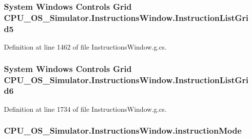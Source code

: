 \subsubsection[{Instruction\+List\+Grid5}]{\setlength{\rightskip}{0pt plus 5cm}System Windows Controls Grid C\+P\+U\+\_\+\+O\+S\+\_\+\+Simulator.\+Instructions\+Window.\+Instruction\+List\+Grid5\hspace{0.3cm}{\ttfamily [package]}}\label{class_c_p_u___o_s___simulator_1_1_instructions_window_a335e8ec02a78ffc483900745de96b602}


Definition at line 1462 of file Instructions\+Window.\+g.\+cs.

\hypertarget{class_c_p_u___o_s___simulator_1_1_instructions_window_a6c86a044f242ee64f312f0105bac6d36}{}
\subsubsection[{Instruction\+List\+Grid6}]{\setlength{\rightskip}{0pt plus 5cm}System Windows Controls Grid C\+P\+U\+\_\+\+O\+S\+\_\+\+Simulator.\+Instructions\+Window.\+Instruction\+List\+Grid6\hspace{0.3cm}{\ttfamily [package]}}\label{class_c_p_u___o_s___simulator_1_1_instructions_window_a6c86a044f242ee64f312f0105bac6d36}


Definition at line 1734 of file Instructions\+Window.\+g.\+cs.

\hypertarget{class_c_p_u___o_s___simulator_1_1_instructions_window_aae7addf8e362e26e981b36b9940a53c0}{}
\subsubsection[{instruction\+Mode}]{ C\+P\+U\+\_\+\+O\+S\+\_\+\+Simulator.\+Instructions\+Window.\+instruction\+Mode\hspace{0.3cm}{\ttfamily [private]}}\label{class_c_p_u___o_s___simulator_1_1_instructions_window_aae7addf8e362e26e981b36b9940a53c0}


